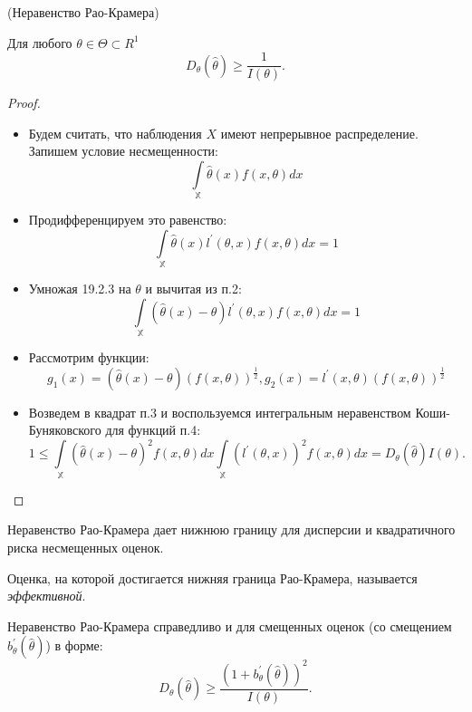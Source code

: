 \begin{theorem}(Неравенство Рао-Крамера)

	Для любого $\theta \in \Theta \subset R^{1}$
	\[
		D_{\theta}(\hat{\theta}) \geqslant \frac{1}{I(\theta)}
	.\]
\end{theorem}
\begin{proof}
	\enewline
        \begin{itemize}
		\item Будем считать, что наблюдения $X$ имеют непрерывное распределение. Запишем условие несмещенности:
			\[
				\int\limits_{\mathbb{X}} \hat{\theta}(x)f(x,\theta) dx
			\]
		\item Продифференцируем это равенство:
			\[
				\int\limits_{\mathbb{X}} \hat{\theta}(x)l^{'}(\theta,x)f(x,\theta) dx = 1
			\]
		\item Умножая 19.2.3 на $\theta$ и вычитая из п.2:
			\[
				\int\limits_{\mathbb{X}} (\hat{\theta}(x) - \theta)l^{'}(\theta,x)f(x,\theta) dx = 1
			\]
		\item Рассмотрим функции:
			\[
				g_1(x) = (\hat{\theta}(x) - \theta)(f(x, \theta))^{\frac{1}{2}}, g_2(x) = l^{'}(x, \theta)(f(x, \theta))^{\frac{1}{2}}
			\]
		\item Возведем в квадрат п.3 и воспользуемся интегральным неравенством Коши-Буняковского для функций п.4:
			\[
				1 \leqslant \int\limits_{\mathbb{X}} (\hat{\theta}(x) - \theta)^2f(x,\theta) dx \int\limits_{\mathbb{X}} (l^{'}(\theta,x))^2f(x,\theta) dx = D_{\theta}(\hat{\theta})I(\theta)
			.\]
	\end{itemize}
\end{proof}

Неравенство Рао-Крамера дает нижнюю границу для дисперсии и квадратичного риска несмещенных оценок.

\begin{definition}
	Оценка, на которой достигается нижняя граница Рао-Крамера, называется \textit{эффективной}.
\end{definition}

\begin{remark}
	Неравенство Рао-Крамера справедливо и для смещенных оценок (со смещением $b^{'}_{\theta}(\hat{\theta})$) в форме:
	\[
		D_{\theta}(\hat{\theta}) \geqslant \frac{(1 + b^{'}_{\theta}(\hat{\theta}))^2}{I(\theta)}
	.\]
\end{remark}

